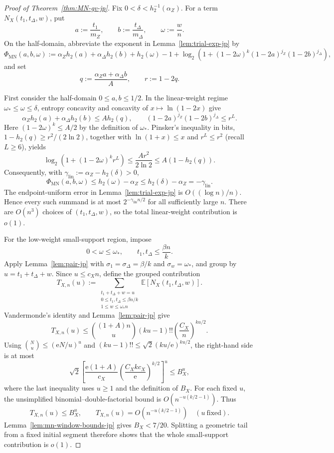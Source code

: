\documentclass[11pt]{article}
\theoremstyle{definition}
\newcommand{\EE}{\mathbb E}
\newcommand{\h}{h_2}
\newcommand{\NX}{N_X}
\begin{document}
\begin{proof}[Proof of Theorem~\ref{thm:MN-gv-jp}]
Fix \(0<\delta<\h^{-1}(\alpha_Z)\).  For a term
\(\NX(t_1,t_\Delta,w)\), put
\[
a:=\frac{t_1}{m_Z},\qquad b:=\frac{t_\Delta}{m_\Delta},
\qquad\omega:=\frac wn.
\]
On the half-domain, abbreviate the exponent in
Lemma~\ref{lem:trial-exp-jp} by
\[
\Phi_{\mathrm{MN}}(a,b,\omega)
:=\alpha_Z\h(a)+\alpha_\Delta\h(b)+\h(\omega)-1
+\log_2\!\left(1+(1-2\omega)^k
(1-2a)^{j_Z}(1-2b)^{j_\Delta}\right),
\]
and set
\[
q:=\frac{\alpha_Za+\alpha_\Delta b}{A},
\qquad r:=1-2q.
\]

First consider the half-domain \(0\le a,b\le1/2\).  In the
linear-weight regime \(\omega_*\le\omega\le\delta\), entropy concavity
and concavity of \(x\mapsto\ln(1-2x)\) give
\[
\alpha_Z\h(a)+\alpha_\Delta\h(b)\le A\h(q),
\qquad
(1-2a)^{j_Z}(1-2b)^{j_\Delta}\le r^L.
\]
Here \((1-2\omega)^k\le A/2\) by the definition of \(\omega_*\).
Pinsker's inequality in bits, \(1-\h(q)\ge r^2/(2\ln2)\), together
with \(\ln(1+x)\le x\) and \(r^L\le r^2\) (recall \(L\ge6\)), yields
\[
\log_2\!\left(1+(1-2\omega)^kr^L\right)
\le \frac{A r^2}{2\ln2}
\le A(1-\h(q)).
\]
Consequently, with \(\gamma_{\mathrm{lin}}:=\alpha_Z-\h(\delta)>0\),
\[
\Phi_{\mathrm{MN}}(a,b,\omega)\le\h(\omega)-\alpha_Z
\le\h(\delta)-\alpha_Z=-\gamma_{\mathrm{lin}}.
\]
The endpoint-uniform error in Lemma~\ref{lem:trial-exp-jp} is
\(O((\log n)/n)\).  Hence every such summand is at most
\(2^{-\gamma_{\mathrm{lin}}n/2}\) for all sufficiently large \(n\).
There are \(O(n^3)\) choices of \((t_1,t_\Delta,w)\), so the total
linear-weight contribution is \(o(1)\).

For the low-weight small-support region, impose
\[
0<\omega\le\omega_*,\qquad
t_1,t_\Delta\le\frac{\beta n}{k}.
\]
Apply Lemma~\ref{lem:pair-jp} with
\(\sigma_1=\sigma_\Delta=\beta/k\) and
\(\sigma_w=\omega_*\), and group by \(u=t_1+t_\Delta+w\).  Since
\(u\le c_Xn\), define the grouped contribution
\[
T_{X,n}(u):=
\sum_{\substack{t_1+t_\Delta+w=u\\
0\le t_1,t_\Delta\le\beta n/k\\1\le w\le\omega_*n}}
\EE[\NX(t_1,t_\Delta,w)].
\]
Vandermonde's identity and Lemma~\ref{lem:pair-jp} give
\[
T_{X,n}(u)
\le \binom{(1+A)n}{u}(ku-1)!!
       \left(\frac{C_X}{n}\right)^{ku/2}.
\]
Using \(\binom{N}{u}\le(\mathrm eN/u)^u\) and
\((ku-1)!!\le\sqrt2(ku/\mathrm e)^{ku/2}\), the right-hand side is at
most
\[
\sqrt2\left[
\frac{\mathrm e(1+A)}{c_X}
\left(\frac{C_Xkc_X}{\mathrm e}\right)^{k/2}
\right]^u
\le B_X^u,
\]
where the last inequality uses \(u\ge1\) and the definition of \(B_X\).
For each fixed \(u\), the unsimplified binomial--double-factorial bound is
\(O(n^{-u(k/2-1)})\).  Thus
\[
T_{X,n}(u)\le B_X^u,
\qquad
T_{X,n}(u)=O(n^{-u(k/2-1)})\quad(u\ \text{fixed}).
\]
Lemma~\ref{lem:mn-window-bounds-jp} gives \(B_X<7/20\).  Splitting a
geometric tail from a fixed initial segment therefore shows that the whole
small-support contribution is \(o(1)\).


\end{proof}
\end{document}
